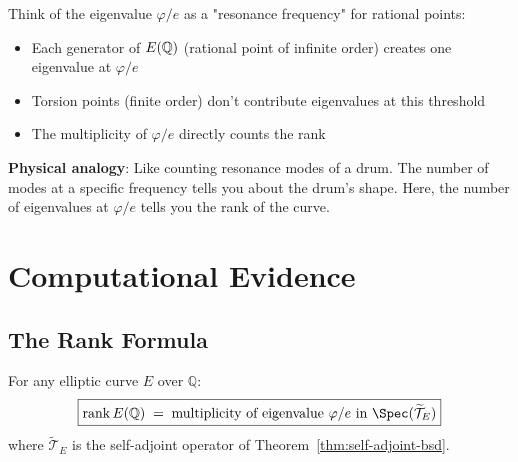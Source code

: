 \begin{intuitive}
Think of the eigenvalue $\varphi/e$ as a "resonance frequency" for rational points:

\begin{itemize}
\item Each generator of $E(\mathbb{Q})$ (rational point of infinite order) creates one eigenvalue at $\varphi/e$
\item Torsion points (finite order) don't contribute eigenvalues at this threshold
\item The multiplicity of $\varphi/e$ directly counts the rank
\end{itemize}

\textbf{Physical analogy}: Like counting resonance modes of a drum. The number of modes at a specific frequency tells you about the drum's shape. Here, the number of eigenvalues at $\varphi/e$ tells you the rank of the curve.
\end{intuitive}

\section{Computational Evidence}

\subsection{The Rank Formula}

\begin{conjecture}\label{conj:rank-equality-fractal}
For any elliptic curve $E$ over $\mathbb{Q}$:
\begin{equation}
\boxed{\rank E(\mathbb{Q}) \;=\; \text{multiplicity of eigenvalue } \varphi/e \text{ in } \Spec(\widetilde{\mathcal{T}}_E)}
\end{equation}
where $\widetilde{\mathcal{T}}_E$ is the self-adjoint operator of Theorem~\ref{thm:self-adjoint-bsd}.
\end{conjecture}


